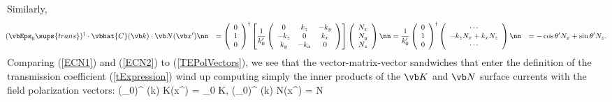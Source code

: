 \documentclass[letterpaper]{article}
\begin{document}
Similarly, 
\begin{align}
&\hspace{-0.05in}
 (\vbEps_0\sups{trans})^\dagger \cdot
 \vbhat{C}(\vb k) \cdot \vb N(\vb x^\prime)
\nn
&=
 \left(\begin{array}{c}0 \\ 1 \\ 0\end{array}\right)^\dagger
 \left[ \frac{1}{k_0^{\prime}}
        \left(\begin{array}{ccc}
               0       & k_z     & -k_y    \\
               -k_z    & 0       & k_x     \\
               k_y     & -k_x    & 0
              \end{array}
        \right)
 \right]
 \left(\begin{array}{c}N_x \\ N_y \\ N_z\end{array}\right)
\nn
&=
 \frac{1}{k_0^\prime}
 \left(\begin{array}{c}0 \\ 1 \\ 0\end{array}\right)^\dagger
 \left(\begin{array}{c} \cdots \\ -k_z N_x + k_x N_z \\ \cdots
       \end{array}\right)
\nn
&=-\cos\theta^\prime N_x + \sin\theta^\prime N_z.
\label{ECN2}
\end{align}
Comparing (\ref{ECN1}) and (\ref{ECN2}) to (\ref{TEPolVectors}),
we see that the 
vector-matrix-vector sandwiches that enter the definition of 
the transmission coefficient (\ref{tExpression}) wind up 
computing simply the inner products of the $\vb K$ and $\vb N$
surface currents with the field polarization vectors: 
{
(\vbEps_0)^\dagger
    \cdot
    (\vb k)
    \cdot
    \vb K(\vb x^\prime)
   = \vbEps_0 \cdot \vb K, 
   \qquad
   (\vbEps_0)^\dagger
    \cdot
    (\vb k)
    \cdot
    \vb N(\vb x^\prime)
   =  \cdot \vb N
}
\end{document}
